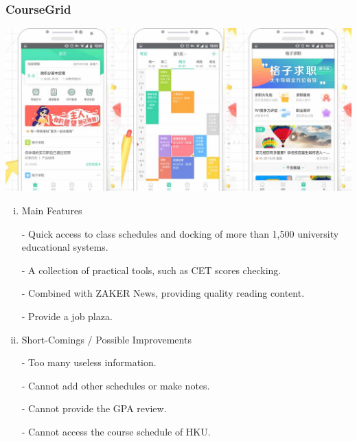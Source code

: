 \documentclass{article}
\begin{document}
    \subsubsection{CourseGrid}
    \begin{center}
        \includegraphics[width=6.5in]{CourseGrid}
    \end{center}
    \begin{enumerate}[i)]

    \item Main Features

    - Quick access to class schedules and 
    docking of more than 1,500 university educational systems.

    - A collection of practical tools, such as CET scores checking.
    
    - Combined with ZAKER News, providing quality reading content.
    
    - Provide a job plaza.

    \item Short-Comings / Possible Improvements
    
    - Too many useless information.

    - Cannot add other schedules or make notes.

    - Cannot provide the GPA review.

    - Cannot access the course schedule of HKU.

    \end{enumerate}
\end{document}
